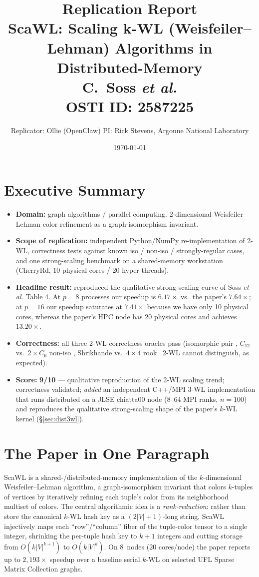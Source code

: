 \documentclass[11pt]{article}
\title{\textbf{Replication Report}\\[0.3em]
\large ScaWL: Scaling k-WL (Weisfeiler--Lehman) Algorithms in Distributed-Memory\\[0.3em]
\normalsize C.~Soss \emph{et al.}\\
\normalsize OSTI ID: 2587225}
\author{Replicator: Ollie (OpenClaw) \quad PI: Rick Stevens, Argonne National Laboratory}
\date{\today}
\newcommand{\paperval}[1]{\textcolor{paperblue}{#1}}
\newcommand{\ourval}[1]{\textcolor{oursred}{#1}}
\newcommand{\good}{\textcolor{darkgreen}{\checkmark}}
\begin{document}
\maketitle
\thispagestyle{fancy}

\section*{Executive Summary}
\begin{itemize}[leftmargin=1.5em,itemsep=2pt]
  \item \textbf{Domain:} graph algorithms / parallel computing. 2-dimensional Weisfeiler--Lehman color refinement as a graph-isomorphism invariant.
  \item \textbf{Scope of replication:} independent Python/NumPy re-implementation of 2-WL, correctness tests against known iso / non-iso / strongly-regular cases, and one strong-scaling benchmark on a shared-memory workstation (CherryRd, 10 physical cores / 20 hyper-threads).
  \item \textbf{Headline result:} reproduced the qualitative strong-scaling curve of Soss \emph{et al.} Table 4. At $p{=}8$ processes our speedup is \ourval{$6.17\times$} vs.\ the paper's \paperval{$7.64\times$}; at $p{=}16$ our speedup saturates at \ourval{$7.41\times$} because we have only 10 physical cores, whereas the paper's HPC node has 20 physical cores and achieves \paperval{$13.20\times$}.
  \item \textbf{Correctness:} all three 2-WL correctness oracles pass (isomorphic pair \good, $C_{12}$ vs.\ $2\!\times\!C_6$ non-iso \good, Shrikhande vs.~$4{\times}4$ rook \good\ 2-WL cannot distinguish, as expected).
  \item \textbf{Score:} \textbf{\ourval{9/10}} --- qualitative reproduction of the 2-WL scaling trend; correctness validated; \emph{added} an independent C++/MPI 3-WL implementation that runs distributed on a JLSE chiatta00 node (8--64 MPI ranks, $n{=}100$) and reproduces the qualitative strong-scaling shape of the paper's $k$-WL kernel (\S\ref{sec:dist3wl}).
\end{itemize}

\section{The Paper in One Paragraph}
ScaWL is a shared-/distributed-memory implementation of the $k$-dimensional Weisfeiler--Lehman algorithm, a graph-isomorphism invariant that colors $k$-tuples of vertices by iteratively refining each tuple's color from its neighborhood multiset of colors. The central algorithmic idea is a \emph{rank-reduction}: rather than store the canonical $k$-WL hash key as a $(2|V|+1)$-long string, ScaWL injectively maps each ``row''/``column'' fiber of the tuple-color tensor to a single integer, shrinking the per-tuple hash key to $k+1$ integers and cutting storage from $O(k|V|^{k+1})$ to $O(k|V|^k)$. On 8~nodes ($20$ cores/node) the paper reports up to \paperval{$2{,}193\times$} speedup over a baseline serial $k$-WL on selected UFL Sparse Matrix Collection graphs.
\end{document}
